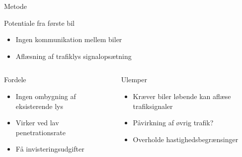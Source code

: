 \begin{frame}{Metode}%

Potentiale fra første bil
\begin{itemize}
\item Ingen kommunikation mellem biler
\item Aflæsning af trafiklys signalopsætning
\end{itemize}

\begin{center}
\begin{columns}%
\begin{column}{0.4\textwidth}
Fordele
\begin{itemize}
\item Ingen ombygning af eksisterende lys
\item Virker ved lav penetrationsrate
\item Få invisteringsudgifter 
\end{itemize}

\vspace{10mm}
\end{column}

\begin{column}{0.5\textwidth}
Ulemper
\begin{itemize}
\item Kræver biler løbende kan aflæse trafiksignaler
\item Påvirkning af øvrig trafik?
\item Overholde hastighedsbegrænsinger %
\end{itemize}
\vspace{8mm}
\end{column}
\end{columns}
\end{center}
\end{frame}

